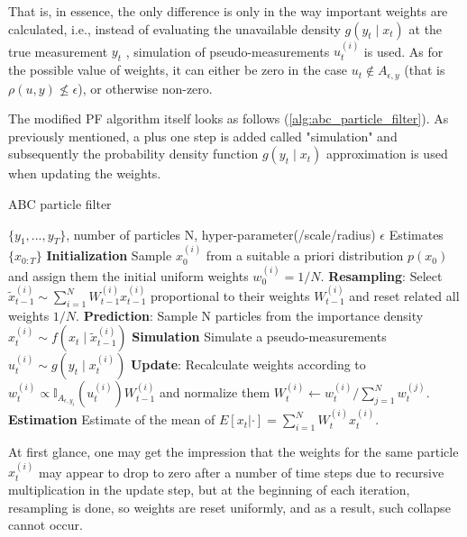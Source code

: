 That is, in essence, the only difference is only in the way important weights are calculated, i.e., instead of evaluating the unavailable density \(g\left(y_t  \mid  x_t\right)\) at the true measurement \(y_t\) , simulation of pseudo-measurements \(u^{(i)}_t\) is used. As for the possible value of weights, it can either be zero in the case \(u_t \notin A_{\epsilon, y}\) (that is \(\rho\left(u, y\right) \nleq \epsilon\)), or otherwise non-zero.

The modified PF algorithm itself looks as follows (\ref{alg:abc_particle_filter}). As previously mentioned, a plus one step is added called "simulation" and subsequently the probability density function \(g \left(y_t \mid x_t\right)\) approximation is used when updating the weights.

\begin{algorithm}
    \caption{ABC particle filter}
  \begin{algorithmic}[1]
    \INPUT \(\{y_1, . . . , y_T\}\), number of particles N, hyper-parameter(/scale/radius) \(\epsilon\)
    \OUTPUT Estimates \(\{\hat{x}_{0:T}\}\)
    \STATE \textbf{Initialization} Sample \(x_0^{(i)}\) from a suitable a priori distribution \(p(x_0)\) and assign them the initial uniform weights \(w_0^{(i)} = 1/N\).
      \STATE \textbf{Resampling}: Select \(\tilde{x}_{t-1}^{(i)}\sim \sum_{i=1}^N W_{t-1}^{(i)} x_{t-1}^{(i)}\) proportional to their weights \(W_{t-1}^{(i)}\) and reset related all weights \(1/N\).
      \STATE \textbf{Prediction}: Sample N particles from the importance density \(x_t^{(i)} \sim f\left(x_t \mid \tilde{x}_{t-1}^{(i)}\right)\)
      \STATE \textbf{Simulation} Simulate a pseudo-measurements $u_t^{(i)} \sim g\left(y_t \mid x_t^{(i)} \right)$      
      \STATE \textbf{Update}: Recalculate weights according to
      \(w_t^{(i)} \propto \mathbb{I}_{A_{\epsilon, y_t}}\left(u_t^{(i)}\right) W_{t-1}^{(i)}\) and normalize them \(W_t^{(i)} \leftarrow w_t^{(i)}/\sum_{j=1}^N w_t^{(j)}\).
    \STATE \textbf{Estimation} Estimate of the mean of \(E[x_t|\cdot] = \sum_{i=1}^{N}W_{t}^{(i)} x_t^{(i)}\).
    \ENDFOR
  \end{algorithmic}
  \label{alg:abc_particle_filter}
\end{algorithm}

At first glance, one may get the impression that the weights for the same particle \(x_t^{(i)}\) may appear to drop to zero after a number of time steps due to recursive multiplication in the update step, but at the beginning of each iteration, resampling is done, so weights are reset uniformly, and as a result, such collapse cannot occur.

